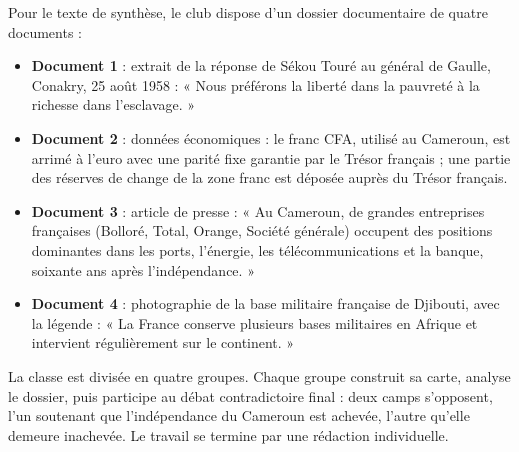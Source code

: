 \documentclass[11pt]{article}
\newcounter{popsec}
\newcounter{popsub}
\newcommand{\courssub}[1]{%
  \stepcounter{popsub}%
  \par\vspace{9pt}\noindent{\popxbold\fontsize{11.5}{13}\selectfont\color{popink}{\color{poporange}\thepopsec.\thepopsub}\hspace{6pt}#1}\par\nopagebreak\vspace{4pt}
}
\begin{document}
Pour le texte de synthèse, le club dispose d'un dossier documentaire de quatre documents :
\begin{itemize}
\item \textbf{Document 1} : extrait de la réponse de Sékou Touré au général de Gaulle, Conakry, 25 août 1958 : « Nous préférons la liberté dans la pauvreté à la richesse dans l'esclavage. »
\item \textbf{Document 2} : données économiques : le franc CFA, utilisé au Cameroun, est arrimé à l'euro avec une parité fixe garantie par le Trésor français ; une partie des réserves de change de la zone franc est déposée auprès du Trésor français.
\item \textbf{Document 3} : article de presse : « Au Cameroun, de grandes entreprises françaises (Bolloré, Total, Orange, Société générale) occupent des positions dominantes dans les ports, l'énergie, les télécommunications et la banque, soixante ans après l'indépendance. »
\item \textbf{Document 4} : photographie de la base militaire française de Djibouti, avec la légende : « La France conserve plusieurs bases militaires en Afrique et intervient régulièrement sur le continent. »
\end{itemize}

La classe est divisée en quatre groupes. Chaque groupe construit sa carte, analyse le dossier, puis participe au débat contradictoire final : deux camps s'opposent, l'un soutenant que l'indépendance du Cameroun est achevée, l'autre qu'elle demeure inachevée. Le travail se termine par une rédaction individuelle.

\courssub{Consignes}
\end{document}
